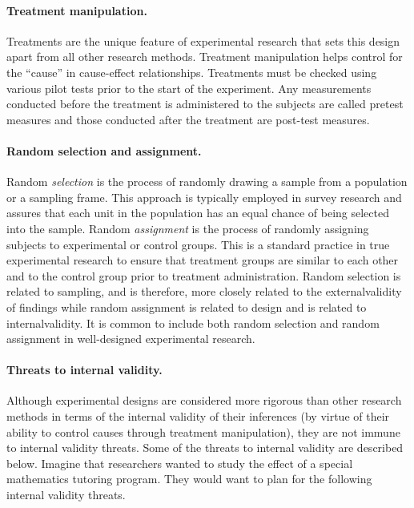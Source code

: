 \paragraph{Treatment manipulation.} Treatments are the unique feature of experimental research that sets this design apart from all other research methods. Treatment manipulation helps control for the ``cause'' in cause-effect relationships. Treatments must be checked using various pilot tests prior to the start of the experiment. Any measurements conducted before the treatment is administered to the subjects are called pretest measures and those conducted after the treatment are post-test measures. 

\paragraph{Random selection and assignment.} Random \textit{selection} is the process of randomly drawing a sample from a population or a sampling frame. This approach is typically employed in survey research and assures that each unit in the population has an equal chance of being selected into the sample. Random \textit{assignment} is the process of randomly assigning subjects to experimental or control groups. This is a standard practice in true experimental research to ensure that treatment groups are similar to each other and to the control group prior to treatment administration. Random selection is related to sampling, and is therefore, more closely related to the \gls{externalvalidity} of findings while random assignment is related to design and is related to \gls{internalvalidity}. It is common to include both random selection and random assignment in well-designed experimental research.

\paragraph{Threats to internal validity.} Although experimental designs are considered more rigorous than other research methods in terms of the internal validity of their inferences (by virtue of their ability to control causes through treatment manipulation), they are not immune to internal validity threats. Some of the threats to internal validity are described below. Imagine that researchers wanted to study the effect of a special mathematics tutoring program. They would want to plan for the following internal validity threats.

